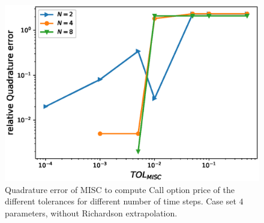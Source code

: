 \documentclass[11pt]{article}
\begin{document}
\begin{figure}[h!]
\centering
\includegraphics[width=0.7\linewidth]{./figures/rBergomi_MISC_quadratre_error/vs_TOL/set4/relative_quad_error_wrt_MISC_TOL_set4_non_rich}


\caption{Quadrature error of MISC to compute Call option price of the different tolerances for different number of time steps. Case  set $4$ parameters, without Richardson extrapolation.}
\label{fig:Quadrature_error_set4}
\end{figure}
\end{document}
